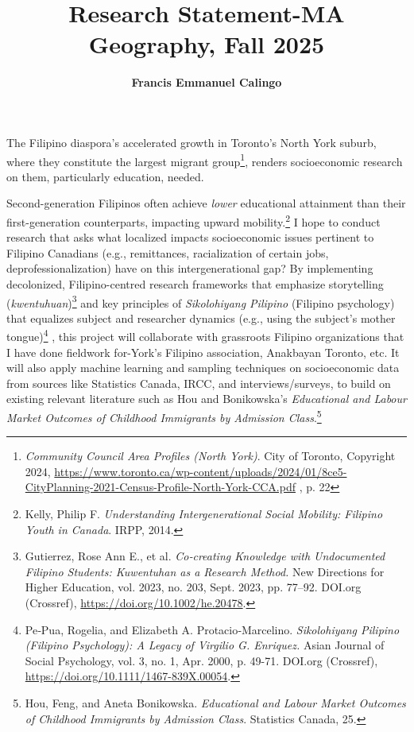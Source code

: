 \documentclass{article}
\title{\textbf{Research Statement-MA Geography, Fall 2025}}
\author{\textbf{Francis Emmanuel Calingo}}
\begin{document}
\maketitle

The Filipino diaspora’s accelerated growth in Toronto’s North York suburb, where they constitute the largest migrant group\footnote{\textit{Community Council Area Profiles (North York)}. City of Toronto, Copyright 2024, \url{https://www.toronto.ca/wp-content/uploads/2024/01/8ce5-CityPlanning-2021-Census-Profile-North-York-CCA.pdf} , p. 22
}, renders socioeconomic research on them, particularly education, needed. 

\vspace{10pt}

Second-generation Filipinos often achieve \textit{lower} educational attainment than their first-generation counterparts, impacting upward mobility.\footnote{Kelly, Philip F. \textit{Understanding Intergenerational Social Mobility: Filipino Youth in Canada}. IRPP, 2014.
} I hope to conduct research that asks what localized impacts socioeconomic issues pertinent to Filipino Canadians (e.g., remittances, racialization of certain jobs, deprofessionalization) have on this intergenerational gap? By implementing decolonized, Filipino-centred research frameworks that emphasize storytelling (\textit{kwentuhuan})\footnote{Gutierrez, Rose Ann E., et al. \textit{Co‐creating Knowledge with Undocumented Filipino Students: Kuwentuhan as a Research Method.} New Directions for Higher Education, vol. 2023, no. 203, Sept. 2023, pp. 77–92. DOI.org (Crossref), \url{https://doi.org/10.1002/he.20478}.} and key principles of \textit{Sikolohiyang Pilipino} (Filipino psychology) that equalizes subject and researcher dynamics (e.g., using the subject’s mother tongue)\footnote{Pe‐Pua, Rogelia, and Elizabeth A. Protacio‐Marcelino. \textit{Sikolohiyang Pilipino (Filipino Psychology): A Legacy of Virgilio G. Enriquez.} Asian Journal of Social Psychology, vol. 3, no. 1, Apr. 2000, p. 49-71. DOI.org (Crossref), \url{https://doi.org/10.1111/1467-839X.00054}.
}
, this project will collaborate with grassroots Filipino organizations that I have done fieldwork for-York’s Filipino association, Anakbayan Toronto, etc. It will also apply machine learning and sampling techniques on socioeconomic data from sources like Statistics Canada, IRCC, and interviews/surveys, to build on existing relevant literature such as Hou and Bonikowska’s \textit{Educational and Labour Market Outcomes of Childhood Immigrants by Admission Class}.\footnote{Hou, Feng, and Aneta Bonikowska. \textit{Educational and Labour Market Outcomes of Childhood Immigrants by Admission Class}. Statistics Canada, 25.}
\end{document}
